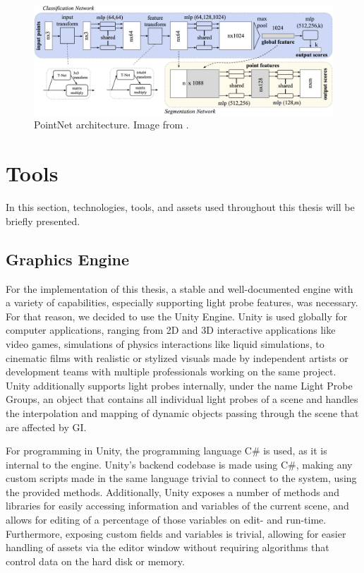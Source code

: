 \begin{figure}[h]
	\centering
	\includegraphics[width=\linewidth]{Graphics/pointnet.jpg}
	\caption{PointNet architecture. Image from \cite{PointNet2017}.}
	\label{fig:pointnet}
\end{figure}

\section{Tools} %
In this section, technologies, tools, and assets used throughout this thesis will be briefly presented.

\subsection{Graphics Engine}
For the implementation of this thesis, a stable and well-documented engine with a variety of capabilities, especially supporting light probe features, was necessary. For that reason, we decided to use the Unity Engine. Unity is used globally for computer applications, ranging from 2D and 3D interactive applications like video games, simulations of physics interactions like liquid simulations, to cinematic films with realistic or stylized visuals made by independent artists or development teams with multiple professionals working on the same project. Unity additionally supports light probes internally, under the name Light Probe Groups, an object that contains all individual light probes of a scene and handles the interpolation and mapping of dynamic objects passing through the scene that are affected by GI.

For programming in Unity, the programming language C\# is used, as it is internal to the engine. Unity's backend codebase is made using C\#, making any custom scripts made in the same language trivial to connect to the system, using the provided methods. Additionally, Unity exposes a number of methods and libraries for easily accessing information and variables of the current scene, and allows for editing of a percentage of those variables on edit- and run-time. Furthermore, exposing custom fields and variables is trivial, allowing for easier handling of assets via the editor window without requiring algorithms that control data on the hard disk or memory.

